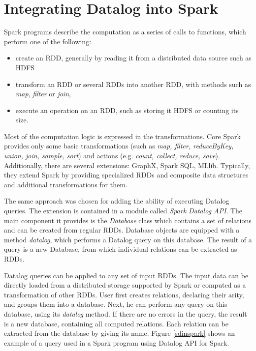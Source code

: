 \section{Integrating Datalog into Spark}

Spark programs describe the computation as a series of calls to functions, which perform one of the following:
\begin{itemize}
  \item create an RDD, generally by reading it from a distributed data source such as HDFS
  \item transform an RDD or several RDDs into another RDD, with methods such as \emph{map}, \emph{filter} or \emph{join},
  \item execute an operation on an RDD, such as storing it HDFS or counting its size.
\end{itemize}

Most of the computation logic is expressed in the transformations.  Core Spark provides only some basic transformations (such as \emph{map, filter, reduceByKey, union, join, sample, sort}) and actions (e.g. \emph{count, collect, reduce, save}). Additionally, there are several extensions: GraphX, Spark SQL, MLlib. Typically, they extend Spark by providing specialized RDDs and composite data structures and additional transformations for them.

The same approach was chosen for adding the ability of executing Datalog queries. The extension is contained in a module called \emph{Spark Datalog API}. The main component it provides is the \emph{Database} class which contains a set of relations and can be created from regular RDDs. Database objects are equipped with a method \emph{datalog}, which performs a Datalog query on this database. The result of a query is a new Database, from which individual relations can be extracted as RDDs. 

Datalog queries can be applied to any set of input RDDs. The input data can be directly loaded from a distributed storage supported by Spark or computed as a transformation of other RDDs. User first creates relations, declaring their arity, and groups them into a database. Next, he can perform any query on this database, using its \emph{datalog} method. If there are no errors in the query, the result is a new database, containing all computed relations. Each relation can be extracted from the database by giving its name. Figure \ref{sdinspark} shows an example of a \datalogra query used in a Spark program using Datalog API for Spark.

